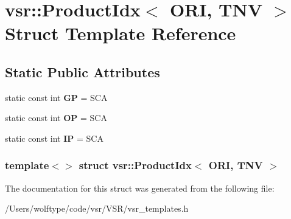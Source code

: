 \hypertarget{structvsr_1_1_product_idx_3_01_o_r_i_00_01_t_n_v_01_4}{\section{vsr\-:\-:Product\-Idx$<$ O\-R\-I, T\-N\-V $>$ Struct Template Reference}
\label{structvsr_1_1_product_idx_3_01_o_r_i_00_01_t_n_v_01_4}
}
\subsection*{Static Public Attributes}
\begin{DoxyCompactItemize}
\item 
\hypertarget{structvsr_1_1_product_idx_3_01_o_r_i_00_01_t_n_v_01_4_a4e050d8fbbaf641dc745d0a4cc6dcbe0}{static const int {\bfseries G\-P} = S\-C\-A}\label{structvsr_1_1_product_idx_3_01_o_r_i_00_01_t_n_v_01_4_a4e050d8fbbaf641dc745d0a4cc6dcbe0}

\item 
\hypertarget{structvsr_1_1_product_idx_3_01_o_r_i_00_01_t_n_v_01_4_aacd828b7b602aad4edcf09e7302c0f79}{static const int {\bfseries O\-P} = S\-C\-A}\label{structvsr_1_1_product_idx_3_01_o_r_i_00_01_t_n_v_01_4_aacd828b7b602aad4edcf09e7302c0f79}

\item 
\hypertarget{structvsr_1_1_product_idx_3_01_o_r_i_00_01_t_n_v_01_4_a60d75502d28f4190ebb7c993cfc1e4aa}{static const int {\bfseries I\-P} = S\-C\-A}\label{structvsr_1_1_product_idx_3_01_o_r_i_00_01_t_n_v_01_4_a60d75502d28f4190ebb7c993cfc1e4aa}

\end{DoxyCompactItemize}
\subsubsection*{template$<$$>$ struct vsr\-::\-Product\-Idx$<$ O\-R\-I, T\-N\-V $>$}



The documentation for this struct was generated from the following file\-:\begin{DoxyCompactItemize}
\item 
/\-Users/wolftype/code/vsr/\-V\-S\-R/vsr\-\_\-templates.\-h\end{DoxyCompactItemize}
